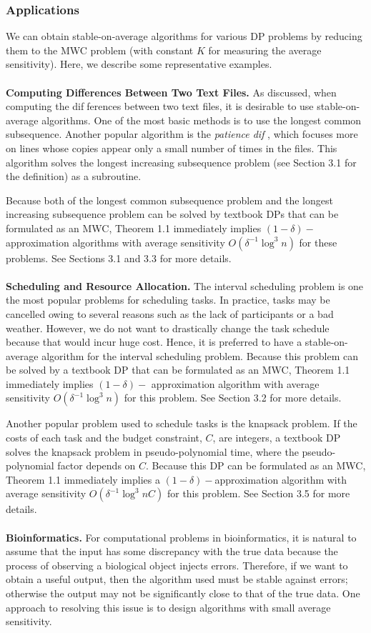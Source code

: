 \documentclass[preprint, 11pt]{article}
\begin{document}
\subsubsection{Applications}
We can obtain stable-on-average algorithms for various DP problems by reducing them to the
MWC problem (with constant $K$ for measuring the average sensitivity). Here, we describe some
representative examples.
\\
\\
\textbf{Computing Differences Between Two Text Files.}  As discussed, when computing the differences between two text files, it is desirable to use stable-on-average algorithms. One of the
most basic methods is to use the longest common subsequence. Another popular algorithm is the
\textit{patience dif} \cite{3}, which focuses more on lines whose copies appear only a small number of times in
the files. This algorithm solves the longest increasing subsequence problem (see Section 3.1 for the
definition) as a subroutine.


Because both of the longest common subsequence problem and the longest increasing subsequence problem can be solved by textbook DPs that can be formulated as an MWC, Theorem 1.1
immediately implies $(1 - \delta)-$approximation algorithms with average sensitivity $O(\delta ^{-1} \log ^3 n)$  for
these problems. See Sections 3.1 and 3.3 for more details.
\\
\\
\textbf{Scheduling and Resource Allocation.}  The interval scheduling problem is one the most popular
problems for scheduling tasks. In practice, tasks may be cancelled owing to several reasons such as
the lack of participants or a bad weather. However, we do not want to drastically change the task
schedule because that would incur huge cost. Hence, it is preferred to have a stable-on-average
algorithm for the interval scheduling problem. Because this problem can be solved by a textbook
DP that can be formulated as an MWC, Theorem 1.1 immediately implies $(1 - \delta)-$ approximation
algorithm with average sensitivity $O(\delta ^{-1} \log ^3 n)$ for this problem. See Section 3.2 for more details.

Another popular problem used to schedule tasks is the knapsack problem. If the costs of each
task and the budget constraint, $C$, are integers, a textbook DP solves the knapsack problem in
pseudo-polynomial time, where the pseudo-polynomial factor depends on $C$. Because this DP can
be formulated as an MWC, Theorem 1.1 immediately implies a $(1 - \delta)-$approximation algorithm
with average sensitivity $O(\delta ^{-1} \log ^3 nC)$ for this problem. See Section 3.5 for more details.
\\
\\
\textbf{Bioinformatics.}  For computational problems in bioinformatics, it is natural to assume that the
input has some discrepancy with the true data because the process of observing a biological object injects errors. Therefore, if we want to obtain a useful output, then the algorithm used must be
stable against errors; otherwise the output may not be significantly close to that of the true data.
One approach to resolving this issue is to design algorithms with small average sensitivity.
\end{document}
